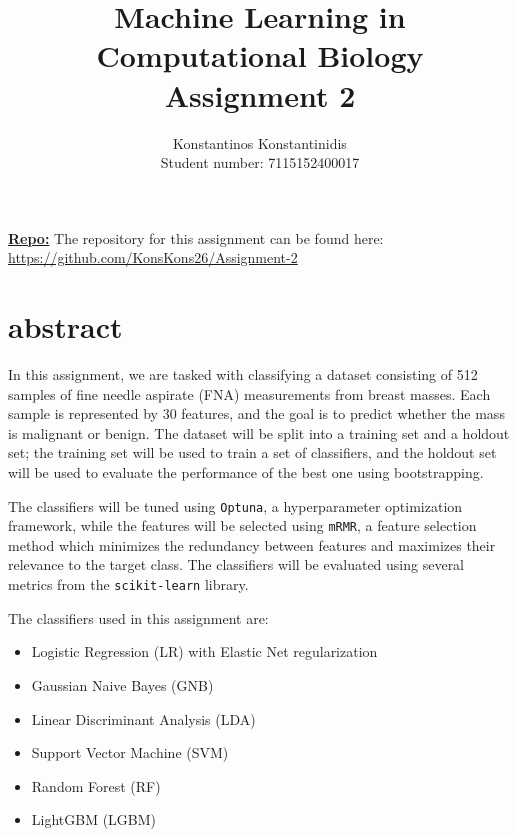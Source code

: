 \documentclass[12pt]{article}
\title{%
    Machine Learning in Computational Biology \\
    \Large Assignment 2
    }
\author{%
    Konstantinos Konstantinidis \\
    Student number: 7115152400017
    }
\begin{document}
\maketitle

\vspace{0.5in}

\textbf{\underline{Repo:}} The repository for this assignment can be found %
here: \\
\url{https://github.com/KonsKons26/Assignment-2}

\vspace{0.5in}

\tableofcontents
\clearpage



\section{abstract}

In this assignment, we are tasked with classifying a dataset consisting of 512
samples of fine needle aspirate (FNA) measurements from breast masses. Each
sample is represented by 30 features, and the goal is to predict whether the
mass is malignant or benign. The dataset will be split into a training set and a
holdout set; the training set will be used to train a set of classifiers, and
the holdout set will be used to evaluate the performance of the best one using
bootstrapping.

The classifiers will be tuned using \texttt{Optuna}, a hyperparameter
optimization framework, while the features will be selected using \texttt{mRMR},
a feature selection method which minimizes the redundancy between features and
maximizes their relevance to the target class. The classifiers will be evaluated
using several metrics from the \texttt{scikit-learn} library.

The classifiers used in this assignment are:

\begin{itemize}
    \item Logistic Regression (LR) with Elastic Net regularization
    \item Gaussian Naive Bayes (GNB)
    \item Linear Discriminant Analysis (LDA)
    \item Support Vector Machine (SVM)
    \item Random Forest (RF)
    \item LightGBM (LGBM)
\end{itemize}
\end{document}
